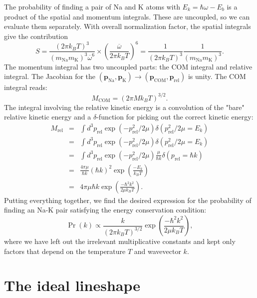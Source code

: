 \documentclass{article}
\theoremstyle{definition}
\newcommand{\f}[2]{\frac{#1}{#2}}
\newcommand{\lp}{\left(}
\newcommand{\rp}{\right)}
\begin{document}
\noindent The probability of finding a pair of Na and K atoms with $E_k = \hbar \omega - E_b$ is a product of the spatial and momentum integrals. These are uncoupled, so we can evaluate them separately. With overall normalization factor, the spatial integrals give the contribution
\begin{equation}
S = \f{(2\pi k_BT)^3}{(m_\text{Na} m_\text{K})^{3} \overline{\omega}^6} \times \lp \f{\overline{\omega}}{2\pi k_B T} \rp^6 = \f{1}{(2\pi k_BT)^3} \f{1}{(m_\text{Na} m _\text{K})^{3}}.
\end{equation}
The momentum integral has two uncoupled parts: the COM integral and relative integral. The Jacobian for the  $(\mathbf{p}_\text{Na}, \mathbf{p}_\text{K}) \to (\mathbf{p}_\text{COM}, \mathbf{p}_\text{rel})$ is unity. The COM integral reads:
\begin{equation}
M_\text{COM} = (2 \pi M k_BT)^{3/2}.
\end{equation}
The integral involving the relative kinetic energy is a convolution of the "bare" relative kinetic energy and a $\delta$-function for picking out the correct kinetic energy:
\begin{eqnarray}
M_\text{rel} 
&=& \int d^3 p_\text{rel} \exp\lp -p^2_\text{rel}/2 \mu \rp \delta\lp p_\text{rel}^2 / 2\mu = E_k  \rp \\
&=& \int d^3 p_\text{rel} \exp\lp -p^2_\text{rel}/2 \mu \rp \delta\lp p_\text{rel}^2 / 2\mu = E_k  \rp \\
&=& \int d^3 p_\text{rel} \exp\lp -p^2_\text{rel}/2 \mu \rp \f{\mu}{\hbar k} \delta(p_\text{rel} = \hbar k)\\
&=& \f{4\pi \mu}{\hbar k} (\hbar k)^2  \exp\lp \f{-E_k}{k_BT} \rp\\
&=& 4\pi \mu \hbar k  \exp\lp \f{-\hbar^2 k^2}{2\mu k_B T} \rp.
\end{eqnarray}
Putting everything together, we find the desired expression for the probability of finding an Na-K pair satisfying the energy conservation condition:
\begin{equation}
\Pr(k) \propto \f{k}{(2\pi k_B T)^{3/2}} \exp \lp \f{-\hbar^2 k^2 }{2 \mu k_B T} \rp,
\end{equation}
where we have left out the irrelevant multiplicative constants and kept only factors that depend on the temperature $T$ and wavevector $k$. 

\section{The ideal lineshape}
\end{document}
